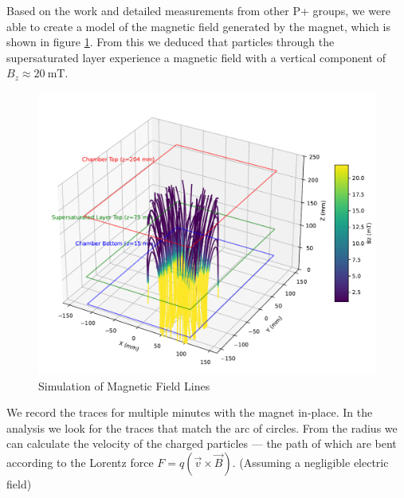 \documentclass[10pt,a4paper]{article}
\begin{document}
Based on the work and detailed measurements from other P+ groups\cite{MagneticFieldMap}, we were able to create a model of the magnetic field generated by the magnet, which is shown in figure \ref{fig:magnet-simulation}. From this we deduced that particles through the supersaturated layer experience a magnetic field with a vertical component of $B_z \approx\qty{20}{\milli\tesla}$. 
\begin{figure}
    \centering
    \includegraphics[width=0.75\linewidth]{images/B-field simulation.pdf}
    \caption{Simulation of Magnetic Field Lines}
    \label{fig:magnet-simulation}
\end{figure}

We record the traces for multiple minutes with the magnet in-place. In the analysis we look for the traces that match the arc of circles. From the radius we can calculate the velocity of the charged particles --- the path of which are bent according to the Lorentz force \(F = q(\vec{v} \times \vec B)\). (Assuming a negligible electric field)
\end{document}
